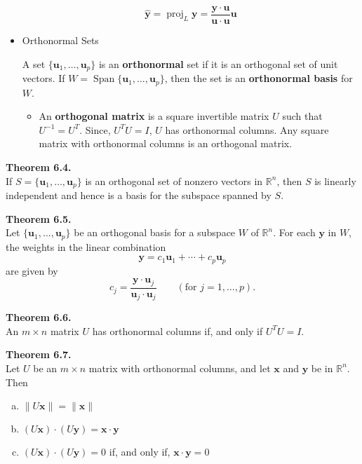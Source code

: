 \documentclass[10pt]{book}
\newenvironment{boxthm}{\begin{mdframed}[backgroundcolor=gray!30,nobreak=true]}{\end{mdframed}}
\newenvironment{boxdef}{\begin{mdframed}[backgroundcolor=gray!30,linewidth=0pt,nobreak=true]}{\end{mdframed}}
\newcommand{\R}{\mathbb{R}}
\newcommand{\vect}[1]{\ensuremath{\boldsymbol{\mathbf{#1}}}}
\DeclareMathOperator{\Span}{Span}
\DeclareMathOperator{\proj}{proj}
\newcommand{\vectset}[3][v]{\{\vect{#1}_{#2},\ldots,\vect{#1}_{#3}\}}
\newcommand{\yhat}{\hat{\vect{y}}}
\begin{document}
\begin{itemize}
\begin{boxdef}
		$$ \yhat = \proj_L\vect{y} = \frac{\vect{y}\cdot\vect{u}}{\vect{u}\cdot\vect{u}}\vect{u} $$
	\end{boxdef}
	\item Orthonormal Sets
	\begin{boxdef}
		A set $\vectset[u]{1}{p}$ is an \textbf{orthonormal} set if it is an orthogonal set of unit vectors. If $W=\Span\vectset[u]{1}{p}$, then the set is an \textbf{orthonormal basis} for $W$.
	\end{boxdef}
	\begin{itemize}
		\item An \textbf{orthogonal matrix} is a square invertible matrix $U$ such that $U^{-1}=U^T$. Since, $U^TU=I$, $U$ has orthonormal columns. Any square matrix with orthonormal columns is an orthogonal matrix.
	\end{itemize}
\end{itemize}


\begin{boxthm}
	\textbf{Theorem 6.4.} \\
	If $S=\vectset[u]{1}{p}$ is an orthogonal set of nonzero vectors in $\R^n$, then $S$ is linearly independent and hence is a basis for the subspace spanned by $S$.
\end{boxthm}
\vspace{-1ex}
\begin{boxthm}
	\textbf{Theorem 6.5.} \\
	Let $\vectset[u]{1}{p}$ be an orthogonal basis for a subspace $W$ of $\R^n$. For each $\vect{y}$ in $W$, the weights in the linear combination
	$$ \vect{y} = c_1\vect{u}_1+\cdots+c_p\vect{u}_p $$
	are given by 
	$$ c_j = \frac{\vect{y}\cdot\vect{u}_j}{\vect{u}_j\cdot\vect{u}_j} \qquad
	(\text{for } j=1,\ldots,p). $$
\end{boxthm}
\vspace{-1ex}
\begin{boxthm}
	\textbf{Theorem 6.6.} \\
	An $m\times n$ matrix $U$ has orthonormal columns if, and only if $U^TU=I$.
\end{boxthm}
\vspace{-1ex}
\begin{boxthm}
	\textbf{Theorem 6.7.} \\
	Let $U$ be an $m\times n$ matrix with orthonormal columns, and let $\vect{x}$ and $\vect{y}$ be in $\R^n$. Then
		\begin{enumerate}[(a)]\itemsep=0em
			\item $\|U\vect{x}\|=\|\vect{x}\|$
			\item $(U\vect{x})\cdot(U\vect{y}) = \vect{x}\cdot\vect{y}$
			\item $(U\vect{x})\cdot(U\vect{y}) = 0$ if, and only if, $\vect{x}\cdot\vect{y}=0$
		\end{enumerate}
\end{boxthm}
\end{document}
